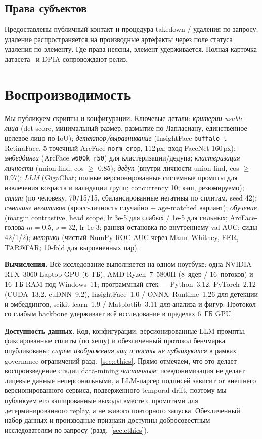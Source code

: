 \documentclass[journal]{IEEEtran}
\begin{document}
\subsection{Права субъектов}\label{sec:eth-rights}
Предоставлены публичный контакт и процедура takedown / удаления по запросу; удаление распространяется на производные артефакты через поле статуса удаления по элементу. Где права неясны, элемент удерживается. Полная карточка датасета~\cite{gebru2021datasheets} и DPIA сопровождают релиз.

\section{Воспроизводимость}\label{sec:repro}
Мы публикуем скрипты и конфигурации. Ключевые детали: \emph{критерии usable-лица} (det-score, минимальный размер, размытие по Лапласиану, единственное целевое лицо по IoU); \emph{детектор/выравнивание} (InsightFace \texttt{buffalo\_l} RetinaFace, 5-точечный ArcFace \texttt{norm\_crop}, 112\,px; вход FaceNet 160\,px); \emph{эмбеддинги} (ArcFace \texttt{w600k\_r50}) для кластеризации/дедупа; \emph{кластеризация личности} (union-find, cos $\geq$ 0.85); \emph{дедуп} (внутри личности union-find, cos $\geq$ 0.97); \emph{LLM} (GigaChat; полные версионированные системные промпты для извлечения возраста и валидации групп; concurrency 10; кэш, резюмируемо); \emph{сплит} (по человеку, 70/15/15, сбалансированные негативы по сплитам, seed 42); \emph{сэмплинг негативов} (кросс-личность случайно $+$ age-matched вариант); \emph{обучение} (margin contrastive, head scope, lr 3e-5 для слабых / 1e-5 для сильных; ArcFace-голова $m{=}0.5$, $s{=}32$, lr 1e-3; ранняя остановка по внутреннему val-AUC; сиды 42/1/2); \emph{метрики} (чистый NumPy ROC-AUC через Mann--Whitney, EER, TAR@FAR; 10-fold для выровненных пар).

\textbf{Вычисления.} Всё исследование выполняется на одном ноутбуке: одна NVIDIA RTX~3060 Laptop GPU (6~ГБ), AMD Ryzen~7~5800H (8~ядер / 16~потоков) и 16~ГБ RAM под Windows~11; программный стек --- Python~3.12, PyTorch~2.12 (CUDA~13.2, cuDNN~9.2), InsightFace~1.0 / ONNX~Runtime~1.26 для детекции и эмбеддингов, scikit-learn~1.9 / Matplotlib~3.11 для анализа и фигур. Протокол со слабым backbone удерживает всё исследование в пределах 6~ГБ GPU.

\textbf{Доступность данных.} Код, конфигурации, версионированные LLM-промпты, фиксированные сплиты (по хешу) и обезличенный протокол бенчмарка опубликованы; \emph{сырые изображения лиц и посты не публикуются} в рамках governance-ограничений разд.~\ref{sec:ethics}. Прямо отмечаем, что это делает воспроизведение стадии data-mining \emph{частичным}: псевдонимизация не делает лицевые данные неперсональными, а LLM-парсер подписей зависит от внешнего версионированного сервиса, подверженного temporal drift, поэтому мы публикуем его кэшированные выходы вместе с промптами для детерминированного replay, а не живого повторного запуска. Обезличенный набор данных и производные признаки доступны добросовестным исследователям по запросу (разд.~\ref{sec:ethics}).
\end{document}
